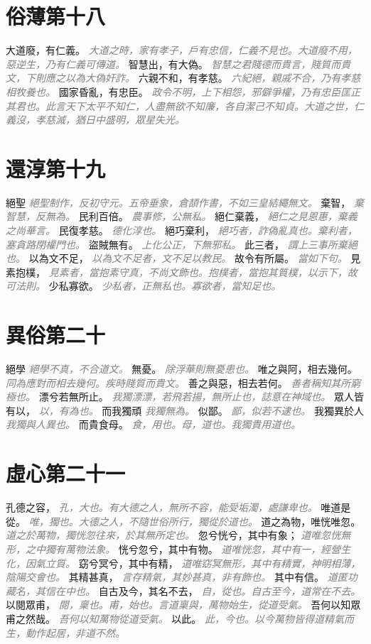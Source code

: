 \documentclass[a4paper,zihao=-4,oneside,landscape,UTF8]{ctexart}
\newcommand{\zhushi}[1]{\scriptsize{\textit{\textcolor{gray}{#1}}}\normalsize}
\begin{document}
\section{俗薄第十八}

大道廢，有仁義。
\zhushi{大道之時，家有孝子，戶有忠信，仁義不見也。大道廢不用，惡逆生，乃有仁義可傳道。}
智慧出，有大偽。
\zhushi{智慧之君賤德而貴言，賤質而貴文，下則應之以為大偽奸詐。}
六親不和，有孝慈。
\zhushi{六紀絕，親戚不合，乃有孝慈相牧養也。}
國家昏亂，有忠臣。
\zhushi{政令不明，上下相怨，邪僻爭權，乃有忠臣匡正其君也。此言天下太平不知仁，人盡無欲不知廉，各自潔己不知貞。大道之世，仁義沒，孝慈滅，猶日中盛明，眾星失光。}


\section{還淳第十九}

絕聖
\zhushi{絕聖制作，反初守元。五帝垂象，倉頡作書，不如三皇結繩無文。}
棄智，
\zhushi{棄智慧，反無為。}
民利百倍。
\zhushi{農事修，公無私。}
絕仁棄義，
\zhushi{絕仁之見恩惠，棄義之尚華言。}
民復孝慈。
\zhushi{德化淳也。}
絕巧棄利，
\zhushi{絕巧者，詐偽亂真也。棄利者，塞貪路閉權門也。}
盜賊無有。
\zhushi{上化公正，下無邪私。}
此三者，
\zhushi{謂上三事所棄絕也。}
以為文不足，
\zhushi{以為文不足者，文不足以教民。}
故令有所屬。
\zhushi{當如下句。}
見素抱樸，
\zhushi{見素者，當抱素守真，不尚文飾也。抱樸者，當抱其質樸，以示下，故可法則。}
少私寡欲。
\zhushi{少私者，正無私也。寡欲者，當知足也。}


\section{異俗第二十}

絕學
\zhushi{絕學不真，不合道文。}
無憂。
\zhushi{除浮華則無憂患也。}
唯之與阿，相去幾何。
\zhushi{同為應對而相去幾何。疾時賤質而貴文。}
善之與惡，相去若何。
\zhushi{善者稱知其所窮極也。}
漂兮若無所止。
\zhushi{我獨漂漂，若飛若揚，無所止也，誌意在神域也。}
眾人皆有以，
\zhushi{以，有為也。}
而我獨頑
\zhushi{我獨無為。}
似鄙。
\zhushi{鄙，似若不逮也。}
我獨異於人
\zhushi{我獨與人異也。}
而貴食母。
\zhushi{食，用也。母，道也。我獨貴用道也。}


\section{虛心第二十一}

孔德之容，
\zhushi{孔，大也。有大德之人，無所不容，能受垢濁，處謙卑也。}
唯道是從。
\zhushi{唯，獨也。大德之人，不隨世俗所行，獨從於道也。}
道之為物，唯恍唯忽。
\zhushi{道之於萬物，獨恍忽往來，於其無所定也。}
忽兮恍兮，其中有象；
\zhushi{道唯忽恍無形，之中獨有萬物法象。}
恍兮忽兮，其中有物。
\zhushi{道唯恍忽，其中有一，經營生化，因氣立質。}
窈兮冥兮，其中有精，
\zhushi{道唯窈冥無形，其中有精實，神明相薄，陰陽交會也。}
其精甚真，
\zhushi{言存精氣，其妙甚真，非有飾也。}
其中有信。
\zhushi{道匿功藏名，其信在中也。}
自古及今，其名不去，
\zhushi{自，從也。自古至今，道常在不去。}
以閱眾甫，
\zhushi{閱，稟也。甫，始也。言道稟與，萬物始生，從道受氣。}
吾何以知眾甫之然哉。
\zhushi{吾何以知萬物從道受氣。}
以此。
\zhushi{此，今也。以今萬物皆得道精氣而生，動作起居，非道不然。}
\end{document}
